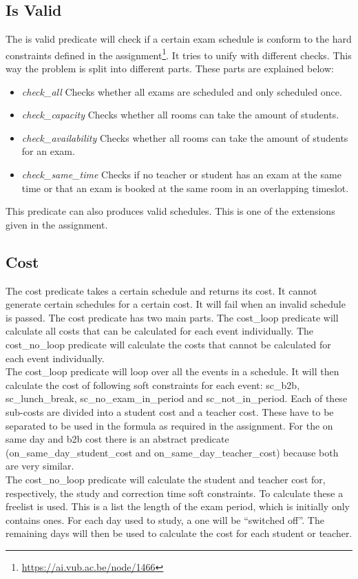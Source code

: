 \documentclass[11pt]{article}
\begin{document}
\subsection{Is Valid}
The is valid predicate will check if a certain exam schedule is conform to the hard constraints defined in the assignment\footnote{\url{https://ai.vub.ac.be/node/1466}}. It tries to unify with different checks. This way the problem is split into different parts. These parts are explained below:
\begin{itemize}
	\item \emph{check\_all} Checks whether all exams are scheduled and only scheduled once.
	\item \emph{check\_capacity}  Checks whether all rooms can take the amount of students.
	\item \emph{check\_availability}  Checks whether all rooms can take the amount of students for an exam.
	\item \emph{check\_same\_time} Checks if no teacher or student has an exam at the same time or that an exam is booked at the same room in an overlapping timeslot.
\end{itemize}
This predicate can also produces valid schedules. This is one of the extensions given in the assignment.

\subsection{Cost}
The cost predicate takes a certain schedule and returns its cost. It cannot generate certain schedules for a certain cost. It will fail when an invalid schedule is passed. The cost predicate has two main parts. The cost\_loop predicate will calculate all costs that can be calculated for each event individually. The cost\_no\_loop predicate will calculate the costs that cannot be calculated for each event individually. \\
The cost\_loop predicate will loop over all the events in a schedule. It will then calculate the cost of following soft constraints for each event: sc\_b2b, sc\_lunch\_break, sc\_no\_exam\_in\_period and sc\_not\_in\_period. Each of these sub-costs are divided into a student cost and a teacher cost. These have to be separated to be used in the formula as required in the assignment. For the on same day and b2b cost there is an abstract predicate (on\_same\_day\_student\_cost and on\_same\_day\_teacher\_cost) because both are very similar.\\
The cost\_no\_loop predicate will calculate the student and teacher cost for, respectively, the study and correction time soft constraints. To calculate these a freelist is used. This is a list the length of the exam period, which is initially only contains ones. For each day used to study, a one will be ``switched off''. The remaining days will then be used to calculate the cost for each student or teacher.
\end{document}
